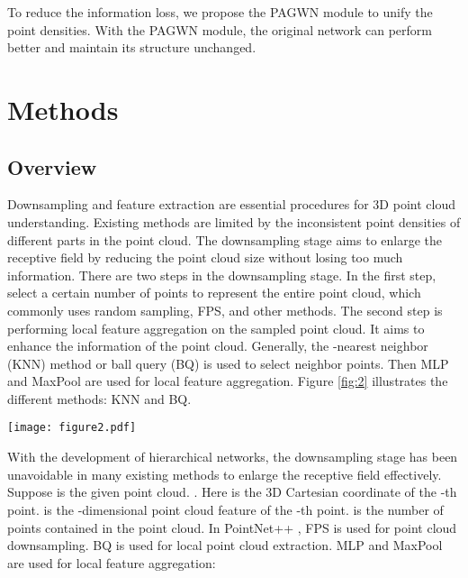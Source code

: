 \documentclass[10pt,twocolumn,letterpaper]{article}
\begin{document}
    To reduce the information loss, we propose the PAGWN module to unify the point densities.
    With the PAGWN module, the original network can perform better and maintain its structure unchanged.

\section{Methods}
    \subsection{Overview}
        Downsampling and feature extraction are essential procedures for 3D point cloud understanding. Existing methods are limited by the inconsistent point densities of different parts in the point cloud. The downsampling stage aims to enlarge the receptive field by reducing the point cloud size without losing too much information. There are two steps in the downsampling stage. In the first step, select a certain number of points to represent the entire point cloud, which commonly uses random sampling, FPS, and other methods. The second step is performing local feature aggregation on the sampled point cloud. It aims to enhance the information of the point cloud. Generally, the -nearest neighbor (KNN) method or ball query (BQ) \cite{13Charles_2017} is used to select neighbor points. Then MLP and MaxPool are used for local feature aggregation. Figure \ref{fig:2} illustrates the different methods: KNN and BQ.
        \begin{figure*}[!htb]
        \centering
        \texttt{[image: figure2.pdf]}
        \caption{Different methods to obtain neighbor points. The neighborhood obtained by the KNN method has a fixed number of points but cannot limit the neighborhood volume. The neighborhood obtained by the BQ method has a fixed volume but no fixed number. (a) uses the -nearest neighbor method to gain local region, while (b) uses ball query.}
        \label{fig:2}
        \end{figure*}

        With the development of hierarchical networks, the downsampling stage has been unavoidable in many existing methods to enlarge the receptive field effectively. Suppose  is the given point cloud. . Here  is the 3D Cartesian coordinate of the -th point.  is the -dimensional point cloud feature of the -th point.  is the number of points contained in the point cloud. In PointNet++ \cite{13Charles_2017}, FPS is used for point cloud downsampling. BQ is used for local point cloud extraction. MLP and MaxPool are used for local feature aggregation:
        
\end{document}
